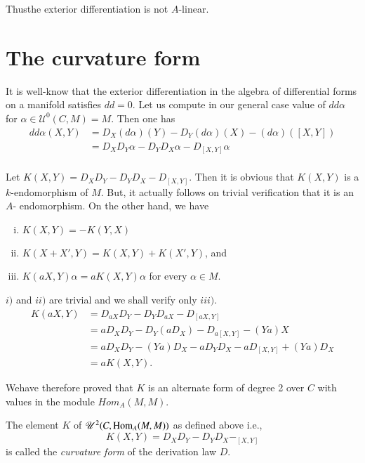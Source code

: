 \noindent
Thus\pageoriginale the exterior differentiation is not $A$-linear.

\section{The curvature form}\label{chap1:sec9} %

It is well-know that the exterior differentiation in the algebra of
differential forms on a manifold satisfies $ dd = 0 $. Let us compute
in our general case value of $ dd \alpha $ for $ \alpha \in
\mathscr{U}^0 (C, M ) = M $. Then one has 
\begin{align*}
  dd \alpha (X,Y) &= D_X ( d \alpha ) (Y) - D_Y (d \alpha ) (X) - ( d
  \alpha ) ( [ X,Y ] ) \\ 
  &= D_X D_Y \alpha - D_Y D_X \alpha - D_{[ X,Y]} \alpha \\
\end{align*}

Let $ K ( X,Y ) = D_X D_Y -D_Y D_X -D_{[X,Y]} $. Then it is obvious
that $ K (X,Y) $ is a $k$-endomorphism of $M$. But, it actually
follows on trivial  verification that it is an $A$- endomorphism. On
the other hand, we have  

\begin{enumerate}[i)]
\item $ K ( X,Y ) = - K ( Y,X ) $
\item $ K ( X + X' ,Y )  = K ( X,Y ) + K ( X',Y )$, and 
\item $ K( a X,Y ) \alpha  = aK ( X,Y ) \alpha$ for every  $\alpha \in M $. 
\end{enumerate}
$i)$ and $ii)$ are trivial and we shall verify only $iii)$.
\begin{align*}
  K ( a X,Y )  &= D_{aX} D_Y -D_Y D_{aX} - D_{[a X,Y]} \\
  &= aD_X D_Y -D_Y ( aD_X ) - D_{a[X,Y]} - ( Ya )X \\
  &= aD_X D_Y - ( Ya ) D_X -a D_Y D_X -a D_{[X,Y]} + ( Ya ) D_X\\
  &= a K( X,Y ).
\end{align*}

We\pageoriginale have therefore proved that $K$ is an alternate form of degree 2 over
$C$ with values in the module $ Hom_A ( M, M ) $. 

\begin{defn}\label{chap1:sec9:def4} %
  The element $K$ of  $ \mathscr{U}^2 ( C, \operatorname{Hom}_A ( M,M ) ) $ as
  defined above i.e., 
  $$
  K (X,Y) = D_X D_Y -D_Y D_X -_{[ X,Y ]}
  $$
  is called the \textit{ curvature form } of the derivation law $D$.
\end{defn}

